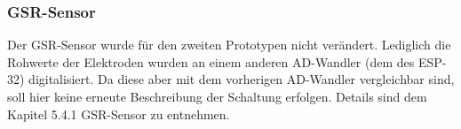 ﻿\subsubsection{GSR-Sensor} \label{gsr-1}

Der GSR-Sensor wurde für den zweiten Prototypen nicht verändert. Lediglich die Rohwerte der Elektroden wurden an einem anderen AD-Wandler (dem des ESP-32) digitalisiert. Da diese aber mit dem vorherigen AD-Wandler vergleichbar sind, soll hier keine erneute Beschreibung der Schaltung erfolgen. Details sind dem Kapitel 5.4.1 GSR-Sensor zu entnehmen. 

